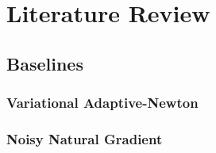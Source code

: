 \chapter{Literature Review}

\section{Baselines}

\subsection{Variational Adaptive-Newton}

\cite{khan2017variational}

\subsection{Noisy Natural Gradient}

\cite{zhang2018noisy}
